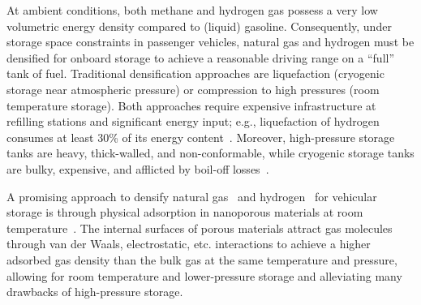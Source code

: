 At ambient conditions, both methane
and hydrogen gas
possess a very low volumetric energy density compared to (liquid) gasoline.
Consequently, under storage space constraints in passenger vehicles, natural gas and hydrogen must be densified for onboard storage to achieve a reasonable driving range on a ``full'' tank of fuel. Traditional densification approaches are liquefaction (cryogenic storage near atmospheric pressure)
or compression to high pressures (room temperature storage).
Both approaches require expensive infrastructure at refilling stations and significant energy input; e.g., liquefaction of hydrogen consumes at least 30\% of its energy content~\cite{bossel2003energy}. Moreover, high-pressure storage tanks are heavy, thick-walled, and non-conformable, while cryogenic storage tanks are bulky, expensive, and afflicted by boil-off losses~\cite{hasan2009minimizing}.

A promising approach to densify natural gas~\cite{makal2012methane,mason2014evaluating} and hydrogen~\cite{suh2011hydrogen,garcia2018benchmark} for vehicular storage is through physical adsorption in nanoporous materials at room temperature~\cite{schoedel2016role}. The internal surfaces of porous materials attract gas molecules through van der Waals, electrostatic, etc. interactions to achieve a higher adsorbed gas density than the bulk gas at the same temperature and pressure, allowing for room temperature and lower-pressure storage and alleviating many drawbacks of high-pressure storage.

